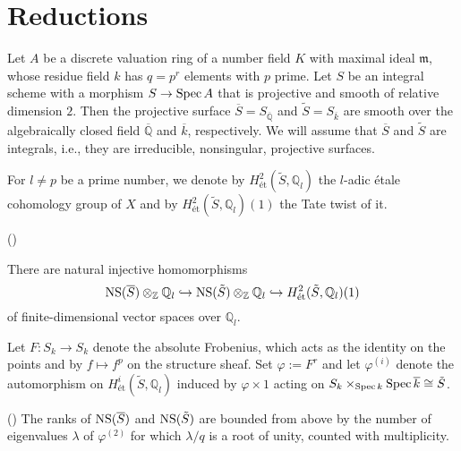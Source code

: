 \documentclass[main]{subfiles}
\begin{document}
\section{Reductions}
\label{sec:reduction}

Let $A$ be a discrete valuation ring of a number field $K$ with maximal ideal $\mathfrak{m}$, whose residue field $k$ has $q=p^r$ elements with $p$ prime.
Let $S$ be an integral scheme with a morphism $S \to \operatorname{Spec} A$ that is projective and smooth of relative dimension $2$.
Then the projective surface $\overline{S}=S_{\overline{\mathbb{Q}}}$ and $\tilde{S}=S_{\overline{k}}$ are smooth over the algebraically closed field $\overline{\mathbb{Q}}$ and $\overline{k}$, respectively.
We will assume that $\overline{S}$ and $\tilde{S}$ are integrals, i.e., they are irreducible, nonsingular, projective surfaces.

For $l \neq p$ be a prime number, we denote by $H_{\text{\'et}}^{2}(\tilde{S}, \mathbb{Q}_l)$ the $l$-adic \'etale cohomology group of $X$ and by $H_{\text{\'et}}^{2}(\tilde{S}, \mathbb{Q}_l)(1)$ the Tate twist of it.

\begin{thm}{(\cite[Proposition 6.2.]{ref:vanluijk2007})}

    There are natural injective homomorphisms
    \begin{equation*}
        \operatorname{NS} (\overline{S}) \otimes_{\mathbb{Z}} \mathbb{Q}_{l} \hookrightarrow \operatorname{NS} (\tilde{S}) \otimes_{\mathbb{Z}} \mathbb{Q}_{l} \hookrightarrow H_{\text{\'et}}^{2}(\tilde{S}, \mathbb{Q}_{l})(1)
    \end{equation*}
    of finite-dimensional vector spaces over $\mathbb{Q}_l$.
\end{thm}

Let $F: S_k \to S_k$ denote the absolute Frobenius, which acts as the identity on the points and by $f \mapsto f^p$ on the structure sheaf.
Set $\varphi:=F^{r}$ and let $\varphi^{(i)}$ denote the automorphism on $H_{\text{\'et}}^{i}(\tilde{S}, \mathbb{Q}_l)$ induced by $\varphi \times 1$ acting on $S_k \times_{\operatorname{Spec} k} \operatorname{Spec} \overline{k} \cong \tilde{S}$.

\begin{cor}{(\cite[Corollary 6.4.]{ref:vanluijk2007})}
    \label{cor:ns_upper_bound}
    The ranks of $\operatorname{NS} (\overline{S})$ and $\operatorname{NS} (\tilde{S})$ are bounded from above by the number of eigenvalues $\lambda$ of $\varphi^{(2)}$ for which $\lambda/q$ is a root of unity, counted with multiplicity.
\end{cor}
\end{document}
